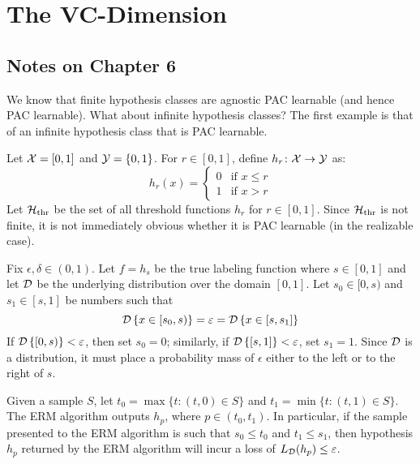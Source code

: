 \chapter{The VC-Dimension}

\section{Notes on Chapter 6}

We know that finite hypothesis classes are agnostic PAC learnable (and hence
PAC learnable).  What about infinite hypothesis classes? The first example is
that of an infinite hypothesis class that is PAC learnable.

\begin{example}
Let $\mathcal{X} = [0, 1]$ and $\mathcal{Y} = \{0, 1\}$. For $r \in [0, 1]$, define
$h_r \colon \mathcal{X} \rightarrow \mathcal{Y} $ as:
\[
    h_r(x) = \left \{ \begin{array}{ll}
                        0 & \text{if } x \leq r \\
                        1 & \text{if } x > r
                      \end{array}\right .
\]
Let $\mathcal{H}_{\text{thr}}$ be the set of all threshold functions $h_r$
for $r \in [0, 1]$. Since $\mathcal{H}_{\text{thr}}$ is not finite, it is
not immediately obvious whether it is PAC learnable (in the realizable case).

Fix $\epsilon, \delta \in (0, 1)$. Let $f = h_s$ be the true labeling function
where $s \in [0, 1]$ and let $\mathcal{D}$ be the underlying distribution over the
domain $[0, 1]$. Let $s_0 \in [0, s)$ and $s_1 \in [s, 1]$ be numbers such that
\[
    \mathcal{D} \left \{ x \in [s_0, s) \right \} = \varepsilon =
    \mathcal{D} \left \{ x \in [s, s_1] \right \}
\]
If $\mathcal{D} \left \{ [0, s) \right \} < \varepsilon$, then set $s_0 = 0$; similarly,
if $\mathcal{D} \left \{ [s, 1] \right \} < \varepsilon$, set $s_1 = 1$. Since $\mathcal{D}$
is a distribution, it must place a probability mass of $\epsilon$ either to
the left or to the right of $s$.

Given a sample $S$, let $t_0 = \max \{t \colon (t, 0) \in S\}$ and $t_1 = \min
\{t \colon (t, 1) \in S\}$. The ERM algorithm outputs $h_p$, where $p \in (t_0,
t_1)$.  In particular, if the sample presented to the ERM algorithm is such
that $s_0 \leq t_0$ and $t_1 \leq s_1$, then hypothesis $h_p$ returned by the ERM
algorithm will incur a loss of $L_{\mathcal{D}}(h_p) \leq \varepsilon$.


\end{example}
